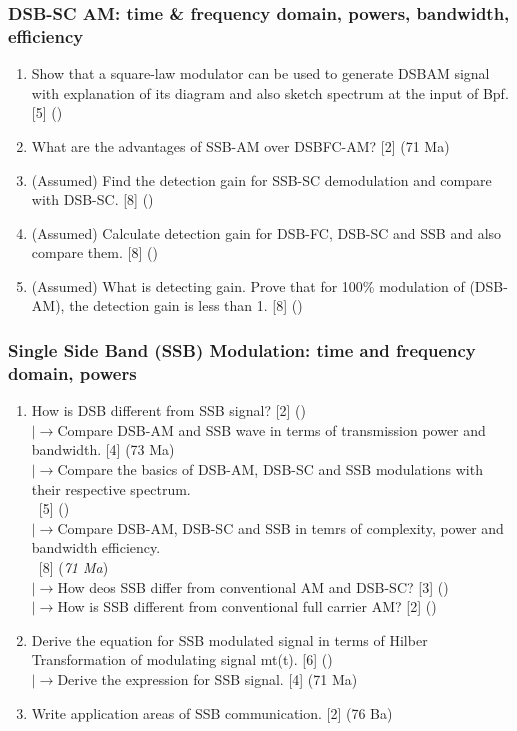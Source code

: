 \documentclass[12pt]{article}
\newcommand{\lb}{\\$\left|\rightarrow\right.$}
\newcommand{\enter}{\\\textcolor{white}{1}}
\begin{document}
    \subsubsection{DSB-SC AM: time \& frequency domain, powers, bandwidth, efficiency}
      \begin{enumerate}
        \item Show that a square-law modulator can be used to generate DSBAM signal with explanation of its diagram and also sketch spectrum at the input of Bpf. \hfill [5] ()

        \item What are the advantages of SSB-AM over DSBFC-AM? \hfill [2] (71 Ma)

        \item (Assumed) Find the detection gain for SSB-SC demodulation and compare with DSB-SC. \hfill [8] ()
        
        \item (Assumed) Calculate detection gain for DSB-FC, DSB-SC and SSB and also compare them. \hfill [8] ()
        
        \item (Assumed) What is detecting gain. Prove that for 100\% modulation of (DSB-AM), the detection gain is less than 1. \hfill [8] ()
      \end{enumerate}

    \subsubsection{Single Side Band (SSB) Modulation: time and frequency domain, powers}
      \begin{enumerate}
        \item How is DSB different from SSB signal? \hfill [2] ()
        \lb Compare DSB-AM and SSB wave in terms of transmission power and bandwidth. \hfill [4] (73 Ma)
        \lb Compare the basics of DSB-AM, DSB-SC and SSB modulations with their respective spectrum.
        \enter\hfill [5] ()
        \lb Compare DSB-AM, DSB-SC and SSB in temrs of complexity, power and bandwidth efficiency.
        \enter\hfill [8] (\textit{71 Ma})
        \lb How deos SSB differ from conventional AM and DSB-SC? \hfill [3] ()
        \lb How is SSB different from conventional full carrier AM? \hfill [2] ()

        \item Derive the equation for SSB modulated signal in terms of Hilber Transformation of modulating signal mt(t). \hfill [6] ()
        \lb Derive the expression for SSB signal. \hfill [4] (71 Ma)

        \item Write application areas of SSB communication. \hfill [2] (76 Ba)
      \end{enumerate}
\end{document}

